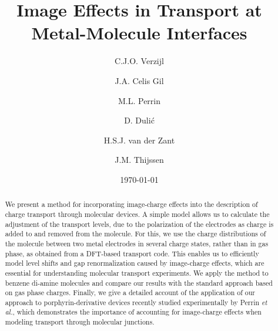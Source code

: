 \documentclass[aip,jcp,a4paper,reprint,floatfix,superscriptaddress]{revtex4-1}
\newcommand{\etal}{\emph{et al.}\xspace}
\begin{document}
\title{Image Effects in Transport at Metal-Molecule Interfaces}

\author{C.J.O. Verzijl}
\author{J.A. Celis Gil}
\author{M.L. Perrin}
\author{D. Duli\'c}
\author{H.S.J. van der Zant}
\author{J.M. Thijssen}

\date{\today}





\begin{abstract}
We present a method for incorporating image-charge effects into the description of charge transport through molecular devices. A simple model allows us to calculate the adjustment of the transport levels, due to the polarization of the electrodes as charge is added to and removed from the molecule. For this, we use the charge distributions of the molecule between two metal electrodes in several charge states, rather than in gas phase, as obtained from a DFT-based transport code.
This enables us to efficiently model level shifts and gap renormalization caused by image-charge effects, which are essential for understanding molecular transport experiments. We apply the method to benzene di-amine molecules and compare our results with the standard approach based on gas phase charges. Finally, we give a detailed account of the application of our approach to porphyrin-derivative devices recently studied experimentally by Perrin \etal, which demonstrates the importance of accounting for image-charge effects when modeling transport through molecular junctions.
\end{abstract}

\maketitle
\end{document}
